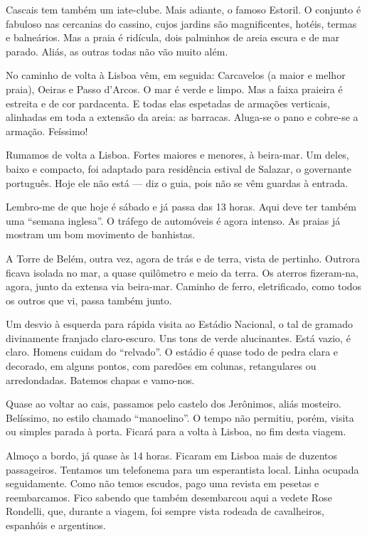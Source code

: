 Cascais tem também um iate-clube. Mais adiante, o famoso Estoril. O conjunto é fabuloso nas cercanias do cassino, cujos jardins são magnificentes, hotéis, termas e balneários. Mas a praia é ridícula, dois palminhos de areia escura e de mar parado. Aliás, as outras todas não vão muito além.

No caminho de volta à Lisboa vêm, em seguida: Carcavelos (a maior e melhor praia), Oeiras e Passo d’Arcos. O mar é verde e limpo. Mas a faixa praieira é estreita e de cor pardacenta. E todas elas espetadas de armações verticais, alinhadas em toda a extensão da areia: as barracas. Aluga-se o pano e cobre-se a armação. Feíssimo!

Rumamos de volta a Lisboa. Fortes maiores e menores, à beira-mar. Um deles, baixo e compacto, foi adaptado para residência estival de Salazar, o governante português. Hoje ele não está --- diz o guia, pois não se vêm guardas à entrada.

Lembro-me de que hoje é sábado e já passa das 13 horas. Aqui deve ter também uma ``semana inglesa''. O tráfego de automóveis é agora intenso. As praias já mostram um bom movimento de banhistas.

A Torre de Belém, outra vez, agora de trás e de terra, vista de pertinho. Outrora ficava isolada no mar, a quase quilômetro e meio da terra. Os aterros fizeram-na, agora, junto da extensa via beira-mar. Caminho de ferro, eletrificado, como todos os outros que vi, passa também junto.

Um desvio à esquerda para rápida visita ao Estádio Nacional, o tal de gramado divinamente franjado claro-escuro. Uns tons de verde alucinantes. Está vazio, é claro. Homens cuidam do ``relvado''. O estádio é quase todo de pedra clara e decorado, em alguns pontos, com paredões em colunas, retangulares ou arredondadas. Batemos chapas e vamo-nos.

Quase ao voltar ao cais, passamos pelo castelo dos Jerônimos, aliás mosteiro. Belíssimo, no estilo chamado ``manoelino''. O tempo não permitiu, porém, visita ou simples parada à porta. Ficará para a volta à Lisboa, no fim desta viagem.

Almoço a bordo, já quase às 14 horas. Ficaram em Lisboa mais de duzentos passageiros. Tentamos um telefonema para um esperantista local. Linha ocupada seguidamente. Como não temos escudos, pago uma revista em pesetas e reembarcamos. Fico sabendo que também desembarcou aqui a vedete Rose Rondelli, que, durante a viagem, foi sempre vista rodeada de cavalheiros, espanhóis e argentinos.

